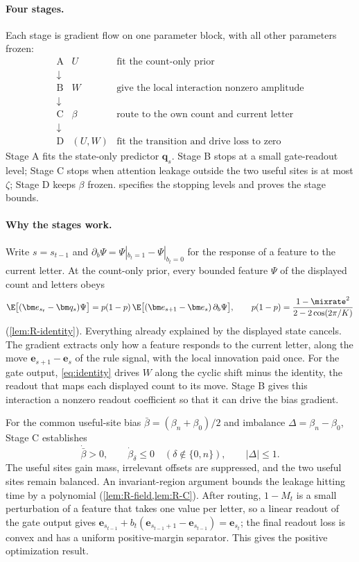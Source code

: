 \paragraph{Four stages.} Each stage is gradient flow on one parameter block, with all other parameters frozen:
\[
 \boxed{\begin{array}{cll}
 \mathrm A &U&\text{fit the count-only prior}\\[1mm]
 \downarrow&&\\[1mm]
 \mathrm B &W&\text{give the local interaction nonzero amplitude}\\[1mm]
 \downarrow&&\\[1mm]
 \mathrm C &\beta&\text{route to the own count and current letter}\\[1mm]
 \downarrow&&\\[1mm]
 \mathrm D &(U,W)&\text{fit the transition and drive loss to zero}
 \end{array}}
\]
Stage A fits the state-only predictor $\bm q_s$. Stage B stops at a small gate-readout level;
Stage C stops when attention leakage outside the two useful sites is at most $\zeta$; Stage D keeps $\beta$ frozen.
 specifies the stopping levels and proves the stage bounds.

\paragraph{Why the stages work.} Write $s=s_{t-1}$ and $\partial_b\Psi=\Psi|_{b_t=1}-\Psi|_{b_t=0}$ for the response of a feature to the
current letter. At the count-only prior, every bounded feature $\Psi$ of the displayed count and letters obeys
\begin{equation}
 \E\bigl[(\bm e_{s_t}-\bm q_{s})\Psi\bigr]=p(1-p)\,\E\bigl[(\bm e_{s+1}-\bm e_{s})\,\partial_b\Psi\bigr],
 \qquad p(1-p)=\frac{1-\mixrate^2}{2-2\cos(2\pi/K)}
 \label{eq:identity}
\end{equation}
(\cref{lem:R-identity}). Everything already explained by the displayed state cancels. The gradient extracts only how a feature
responds to the current letter, along the move $\bm e_{s+1}-\bm e_s$ of the rule signal, with the local innovation paid once.
For the gate output, \cref{eq:identity} drives $W$ along the cyclic shift minus the identity, the readout that maps each displayed count to its move.
Stage B gives this interaction a nonzero readout coefficient so that it can drive the bias gradient.

For the common useful-site bias $\bar\beta=(\beta_n+\beta_0)/2$ and imbalance $\Delta=\beta_n-\beta_0$, Stage C establishes
\[
 \dot{\bar\beta}>0,\qquad
 \dot\beta_\delta\le0\quad(\delta\notin\{0,n\}),\qquad
 |\Delta|\le1.
\]
The useful sites gain mass, irrelevant offsets are suppressed, and the two useful sites remain balanced.
An invariant-region argument bounds the leakage hitting time by a polynomial (\cref{lem:R-field,lem:R-C}).
After routing, $1-M_t$ is a small perturbation of a feature that takes one value per letter, so a linear readout of the gate
output gives $\bm e_{s_{t-1}}+b_t(\bm e_{s_{t-1}+1}-\bm e_{s_{t-1}})=\bm e_{s_t}$; the final readout loss is convex and has a uniform
positive-margin separator. This gives the positive optimization result.

